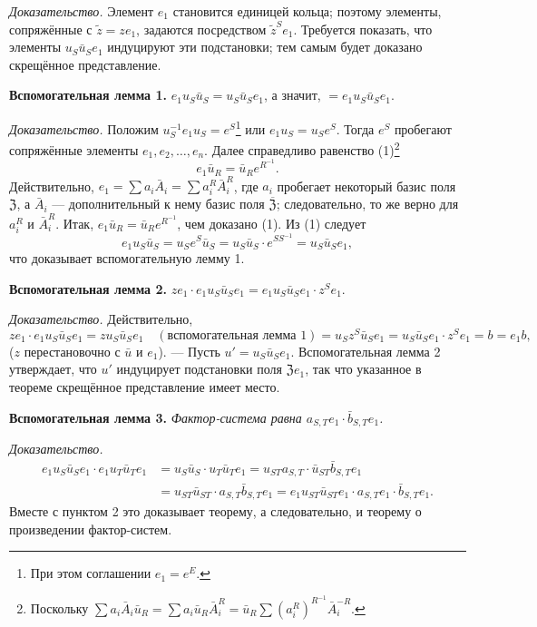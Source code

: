 \documentclass[11pt]{article}
\newcommand{\srcfn}[2]{\footnote{#2}}
\begin{document}
\noindent\emph{Доказательство.} Элемент \(e_1\) становится единицей кольца; поэтому элементы, сопряжённые с \(\tilde z=ze_1\), задаются посредством \(\tilde z^Se_1\). Требуется показать, что элементы \(u_S\bar u_Se_1\) индуцируют эти подстановки; тем самым будет доказано скрещённое представление.

\noindent\textbf{Вспомогательная лемма 1.} \(e_1u_S\bar u_S=u_S\bar u_Se_1\), а значит, \(=e_1u_S\bar u_Se_1\).

\noindent\emph{Доказательство.} Положим \(u_S^{-1}e_1u_S=e^S\)\srcfn{1}{При этом соглашении \(e_1=e^E\).} или \(e_1u_S=u_Se^S\). Тогда \(e^S\) пробегают сопряжённые элементы \(e_1,e_2,\ldots,e_n\). Далее справедливо равенство (1)\srcfn{2}{Поскольку \(\sum a_i\bar A_i\bar u_R=\sum a_i\bar u_R\bar A_i^R=\bar u_R\sum(a_i^R)^{R^{-1}}\bar A_i^{-R}\).}
\[
e_1\bar u_R=\bar u_Re^{R^{-1}}.
\]
Действительно, \(e_1=\sum a_i\bar A_i=\sum a_i^R\bar A_i^R\), где \(a_i\) пробегает некоторый базис поля \(\mathfrak Z\), а \(\bar A_i\) --- дополнительный к нему базис поля \(\overline{\mathfrak Z}\); следовательно, то же верно для \(a_i^R\) и \(\bar A_i^R\). Итак, \(e_1\bar u_R=\bar u_Re^{R^{-1}}\), чем доказано (1). Из (1) следует
\[
e_1u_S\bar u_S=u_Se^S\bar u_S=u_S\bar u_S\cdot e^{SS^{-1}}=u_S\bar u_Se_1,
\]
что доказывает вспомогательную лемму 1.

\noindent\textbf{Вспомогательная лемма 2.} \(ze_1\cdot e_1u_S\bar u_Se_1=e_1u_S\bar u_Se_1\cdot z^Se_1\).

\noindent\emph{Доказательство.} Действительно,
\[
ze_1\cdot e_1u_S\bar u_Se_1
=zu_S\bar u_Se_1\quad(\text{вспомогательная лемма 1})
=u_Sz^S\bar u_Se_1
=u_S\bar u_Se_1\cdot z^Se_1
=b=e_1b,
\]
(\(z\) перестановочно с \(\bar u\) и \(e_1\)). --- Пусть \(u'=u_S\bar u_Se_1\). Вспомогательная лемма 2 утверждает, что \(u'\) индуцирует подстановки поля \(\mathfrak Ze_1\), так что указанное в теореме скрещённое представление имеет место.

\noindent\textbf{Вспомогательная лемма 3.} \emph{Фактор-система равна \(a_{S,T}e_1\cdot\bar b_{S,T}e_1\).}

\noindent\emph{Доказательство.}
\[
\begin{aligned}
e_1u_S\bar u_Se_1\cdot e_1u_T\bar u_Te_1
&=u_S\bar u_S\cdot u_T\bar u_Te_1
 =u_{ST}a_{S,T}\cdot\bar u_{ST}\bar b_{S,T}e_1\\
&=u_{ST}\bar u_{ST}\cdot a_{S,T}\bar b_{S,T}e_1
 =e_1u_{ST}\bar u_{ST}e_1\cdot a_{S,T}e_1\cdot\bar b_{S,T}e_1.
\end{aligned}
\]
Вместе с пунктом 2 это доказывает теорему, а следовательно, и теорему о произведении фактор-систем.
\end{document}

